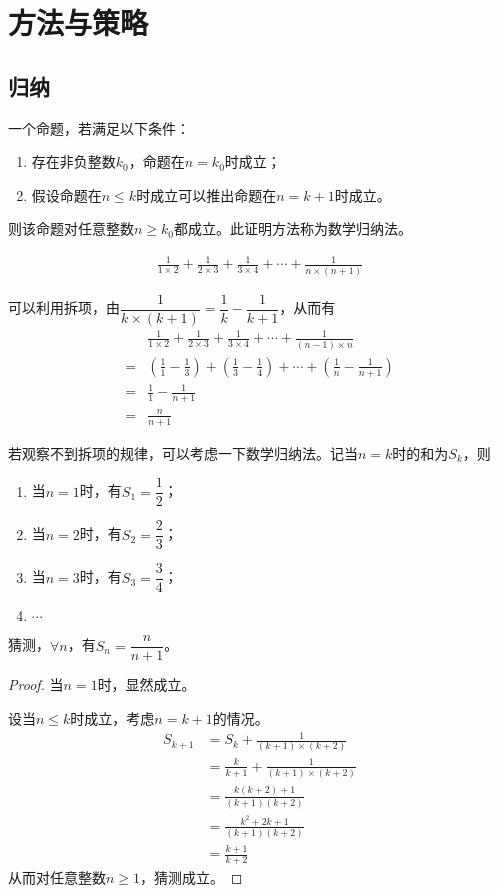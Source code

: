 
\chapter{方法与策略}
\label{chap:methods}

\section{归纳}
\label{sec:induction}

\begin{definition}
  一个命题，若满足以下条件：
  \begin{enumerate}
  \item 存在非负整数$k_0$，命题在$n=k_0$时成立；
  \item 假设命题在$n\le k$时成立可以推出命题在$n=k+1$时成立。
  \end{enumerate}
  则该命题对任意整数$n\ge k_0$都成立。此证明方法称为数学归纳法。
\end{definition}

\begin{example}[求和]
  \begin{align*}
    \frac1{1\times2}+\frac1{2\times3}+\frac1{3\times4}+\cdots+\frac1{n\times (n+1)}
  \end{align*}
\end{example}

可以利用拆项，由$\dfrac1{k\times (k+1)}=\dfrac1k-\dfrac1{k+1}$，从而有
\begin{align*}
  &\frac1{1\times2}+\frac1{2\times3}+\frac1{3\times4}+\cdots+\frac1{(n-1)\times n}\\
  =&\left(\frac11-\frac13\right) + \left(\frac13-\frac14\right) + \cdots + \left(\frac1n-\frac1{n+1}\right)\\
  =&\frac11-\frac1{n+1}\\
  =&\frac{n}{n+1}
\end{align*}

若观察不到拆项的规律，可以考虑一下数学归纳法。记当$n=k$时的和为$S_k$，则
\begin{enumerate}
\item 当$n=1$时，有$S_1=\dfrac12$；
\item 当$n=2$时，有$S_2=\dfrac23$；
\item 当$n=3$时，有$S_3=\dfrac34$；
\item $\cdots$
\end{enumerate}
猜测，$\forall n$，有$S_n=\dfrac{n}{n+1}$。
\begin{proof}
  当$n=1$时，显然成立。

  设当$n\le k$时成立，考虑$n=k+1$的情况。
  \begin{align*}
    S_{k+1}&=S_k + \frac1{(k+1)\times(k+2)}\\
           &=\frac{k}{k+1}+\frac1{(k+1)\times(k+2)}\\
           &=\frac{k(k+2)+1}{(k+1)(k+2)}\\
           &=\frac{k^2+2k+1}{(k+1)(k+2)}\\
           &=\frac{k+1}{k+2}
  \end{align*}
  从而对任意整数$n\ge1$，猜测成立。
\end{proof}



